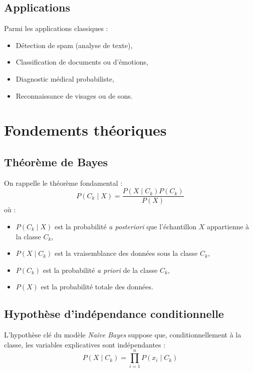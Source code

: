 \documentclass[12pt,a4paper]{article}
\begin{document}
\subsection{Applications}
Parmi les applications classiques :
\begin{itemize}
    \item Détection de spam (analyse de texte),
    \item Classification de documents ou d’émotions,
    \item Diagnostic médical probabiliste,
    \item Reconnaissance de visages ou de sons.
\end{itemize}

\section{Fondements théoriques}

\subsection{Théorème de Bayes}
On rappelle le théorème fondamental :
\begin{equation}
    P(C_k \mid X) = \frac{P(X \mid C_k) P(C_k)}{P(X)}
\end{equation}
où :
\begin{itemize}
    \item \( P(C_k \mid X) \) est la probabilité \textit{a posteriori} que l’échantillon \( X \) appartienne à la classe \( C_k \),
    \item \( P(X \mid C_k) \) est la vraisemblance des données sous la classe \( C_k \),
    \item \( P(C_k) \) est la probabilité \textit{a priori} de la classe \( C_k \),
    \item \( P(X) \) est la probabilité totale des données.
\end{itemize}

\subsection{Hypothèse d’indépendance conditionnelle}
L’hypothèse clé du modèle \textit{Naïve Bayes} suppose que, conditionnellement à la classe, les variables explicatives sont indépendantes :
\begin{equation}
    P(X \mid C_k) = \prod_{i=1}^{n} P(x_i \mid C_k)
\end{equation}
\end{document}
